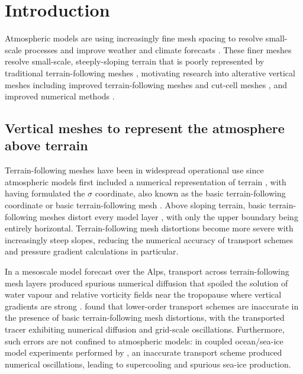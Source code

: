 \chapter{Introduction}
\vspace*{-1em}

Atmospheric models are using increasingly fine mesh spacing to resolve small-scale processes and improve weather and climate forecasts \citep{wedi2014}.
These finer meshes resolve small-scale, steeply-sloping terrain that is poorly represented by traditional terrain-following meshes \citep{schaer2002}, motivating research into alterative vertical meshes including improved terrain-following meshes \citep{schaer2002,klemp2011} and cut-cell meshes \citep{jaehn2015,yamazaki2016}, and improved numerical methods \citep{zaengl2012,steppeler-klemp2017}.

\section{Vertical meshes to represent the atmosphere above terrain}

Terrain-following meshes have been in widespread operational use since atmospheric models first included a numerical representation of terrain \citep{steppeler2003}, with \citet{phillips1957} having formulated the $\sigma$ coordinate, also known as the basic terrain-following coordinate or basic terrain-following mesh \citep{galchen-somerville1975a}.
Above sloping terrain, basic terrain-following meshes distort every model layer , with only the upper boundary being entirely horizontal.
Terrain-following mesh distortions become more severe with increasingly steep slopes, reducing the numerical accuracy of transport schemes and pressure gradient calculations in particular.

In a mesoscale model forecast over the Alps, transport across terrain-following mesh layers produced spurious numerical diffusion that spoiled the solution of water vapour and relative vorticity fields near the tropopause where vertical gradients are strong \citep{hoinka-zaengl2004}.
\citet{schaer2002} found that lower-order transport schemes are inaccurate in the presence of basic terrain-following mesh distortions, with the transported tracer exhibiting numerical diffusion and grid-scale oscillations.
Furthermore, such errors are not confined to atmospheric models: in coupled ocean/sea-ice model experiments performed by \citet{naughten2017}, an inaccurate transport scheme produced numerical oscillations, leading to supercooling and spurious sea-ice production.

